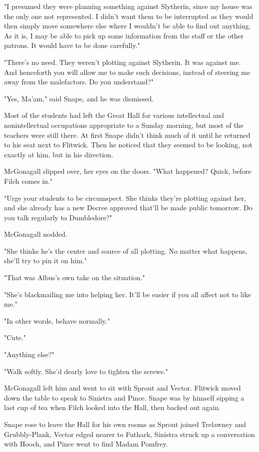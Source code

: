 "I presumed they were planning something against Slytherin, since my house was the only one not represented. I didn't want them to be interrupted as they would then simply move somewhere else where I wouldn't be able to find out anything. As it is, I may be able to pick up some information from the staff or the other patrons. It would have to be done carefully."

"There's no need. They weren't plotting against Slytherin. It was against me. And henceforth you will allow me to make such decisions, instead of steering me away from the malefactors. Do you understand?"

"Yes, Ma'am," said Snape, and he was dismissed.

Most of the students had left the Great Hall for various intellectual and nonintellectual occupations appropriate to a Sunday morning, but most of the teachers were still there. At first Snape didn't think much of it until he returned to his seat next to Flitwick. Then he noticed that they seemed to be looking, not exactly at him, but in his direction.

McGonagall slipped over, her eyes on the doors. "What happened? Quick, before Filch comes in."

"Urge your students to be circumspect. She thinks they're plotting against her, and she already has a new Decree approved that'll be made public tomorrow. Do you talk regularly to Dumbledore?"

McGonagall nodded.

"She thinks he's the center and source of all plotting. No matter what happens, she'll try to pin it on him."

"That was Albus's own take on the situation."

"She's blackmailing me into helping her. It'll be easier if you all affect not to like me."

"In other words, behave normally."

"Cute."

"Anything else?"

"Walk softly. She'd dearly love to tighten the screws."

McGonagall left him and went to sit with Sprout and Vector. Flitwick moved down the table to speak to Sinistra and Pince. Snape was by himself sipping a last cup of tea when Filch looked into the Hall, then backed out again.

Snape rose to leave the Hall for his own rooms as Sprout joined Trelawney and Grubbly-Plank, Vector edged nearer to Futhark, Sinistra struck up a conversation with Hooch, and Pince went to find Madam Pomfrey.

